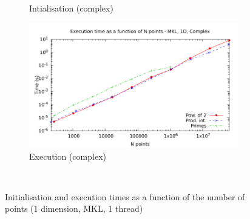 \documentclass[12pt, a4paper]{article}
\begin{document}
\begin{figure}[H]
\begin{subfigure}{.5\textwidth}
\caption{Intialisation (complex)}
\label{1DMKLCI}
\end{subfigure}%
\begin{subfigure}{.5\textwidth}
\centering
\includegraphics[width=.9\linewidth]{graphs/1d-mkl-exec-c.pdf}
\caption{Execution (complex)}
\label{1DMKLC}
\end{subfigure}\\
\caption{Initialisation and execution times as a function of the number of points (1 dimension, MKL, 1 thread)}
\label{1DMKL}
\end{figure}
\end{document}
